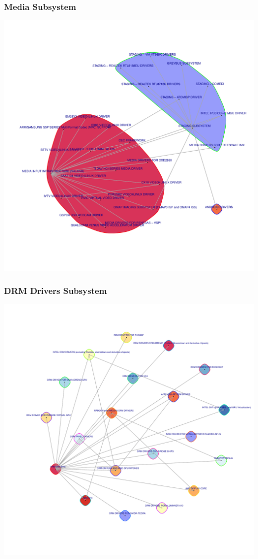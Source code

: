\documentclass[9pt]{beamer}
\begin{document}
\begin{frame}
	\frametitle{Media Subsystem}
	\begin{center}
	\includegraphics[scale=0.3]{clusters/8_media.pdf}
	\end{center}
\end{frame}

	\begin{frame}
		\frametitle{DRM Drivers Subsystem}
	\begin{center}
	\includegraphics[scale=0.3]{clusters/12_drm.pdf}
	\end{center}
\end{frame}
\end{document}
